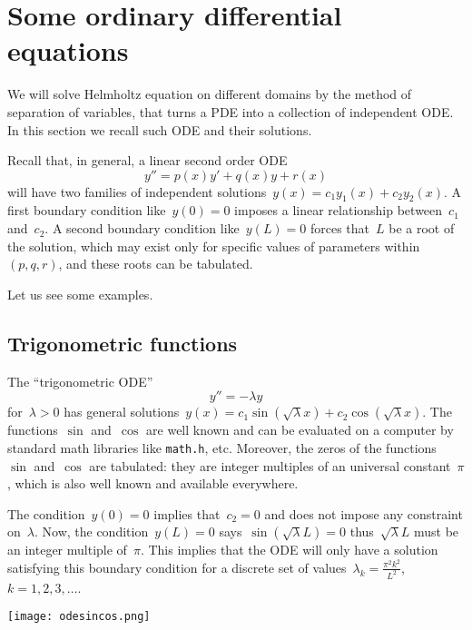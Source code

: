 \clearpage
\section{Some ordinary differential equations}
We will solve Helmholtz equation on different domains by the method
of separation of variables, that turns a PDE into a collection of
independent ODE.  In this section we recall such ODE and their
solutions.

Recall that, in general, a linear second order ODE
\[
y'' = p(x)y'+q(x)y+r(x)
\]
will have two
families of independent solutions~$y(x) =
c_1y_{1}(x)+c_2y_{2}(x)$.
A first boundary condition like~$y(0)=0$  imposes a linear
relationship between~$c_1$ and~$c_2$.  A second boundary condition
like~$y(L)=0$ forces that~$L$ be a root of the solution, which may
exist only for specific values of parameters within $(p,q,r)$, and these
roots can be tabulated.

Let us see some examples.

\subsection{Trigonometric functions}

The ``trigonometric ODE''
\begin{equation}\label{eq:trigo}
	y'' = -\lambda y
\end{equation}
for~$\lambda>0$
has general solutions~$y(x)=c_1\sin\left(\sqrt\lambda x\right)
+ c_2\cos\left(\sqrt\lambda x\right)$.  The functions~$\sin$
and~$\cos$ are well known and can be evaluated on a computer by
standard math libraries like \verb+math.h+, etc.
Moreover, the zeros of the functions~$\sin$ and~$\cos$ are tabulated: they are
integer multiples of an universal constant~$\pi$, which is also well
known and available everywhere.

The condition~$y(0)=0$ implies that~$c_2=0$ and does not impose any
constraint on~$\lambda$.  Now, the
condition~$y(L)=0$ says~$\sin\left(\sqrt\lambda L\right)=0$
thus~$\sqrt\lambda L$ must be an integer multiple of~$\pi$.  This
implies that the ODE will only have a solution satisfying this
boundary condition for a discrete set of
values~$\lambda_k=\frac{\pi^2 k^2}{L^2}$, $k=1,2,3,\ldots$.

\texttt{[image: odesincos.png]}

